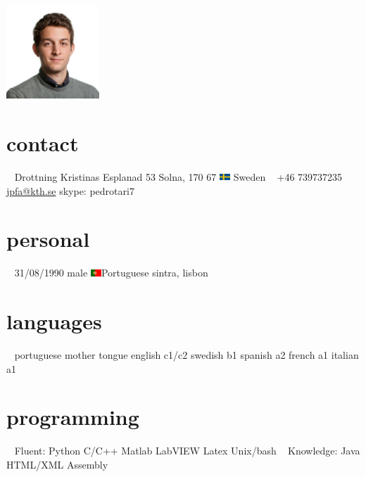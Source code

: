 \documentclass[]{friggeri-cv} %
\begin{document}


\begin{aside} %

\includegraphics[width=3.5cm,height=3.5cm]{photo}
\section{contact}
~
Drottning Kristinas Esplanad 53
Solna, 170 67
\includegraphics[width=0.4cm,height=0.3cm]{sweden} Sweden
~
+46 739737235
~
\href{mailto:jpfa@kth.se}{jpfa@kth.se}
skype: pedrotari7
\section{personal}
~
31/08/1990
male
\includegraphics[width=0.4cm,height=0.3cm]{portugal}Portuguese
sintra, lisbon
\section{languages}
~
portuguese mother tongue
english c1/c2
swedish b1
spanish a2
french a1
italian a1
\section{programming}
~
Fluent:
Python
C/C++
Matlab
LabVIEW
Latex
Unix/bash
~
Knowledge:
Java
HTML/XML
Assembly 
\end{aside}


\end{document}
